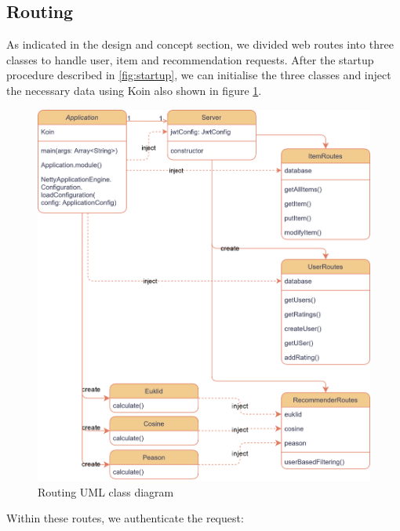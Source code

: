 \newpage

\subsection{Routing}

As indicated in the design and concept section, we divided web routes into three classes to handle user, item and recommendation requests. After the startup procedure described in \ref{fig:startup}, we can initialise the three classes and inject the necessary data using Koin also shown in figure \ref{fig:routing}.

\begin{figure}[h!]
\centering
\includegraphics[width=\textwidth]{images/RoutingUML.png}
\caption{\label{fig:routing}Routing UML class diagram}
\end{figure}

\newpage

Within these routes, we authenticate the request:

